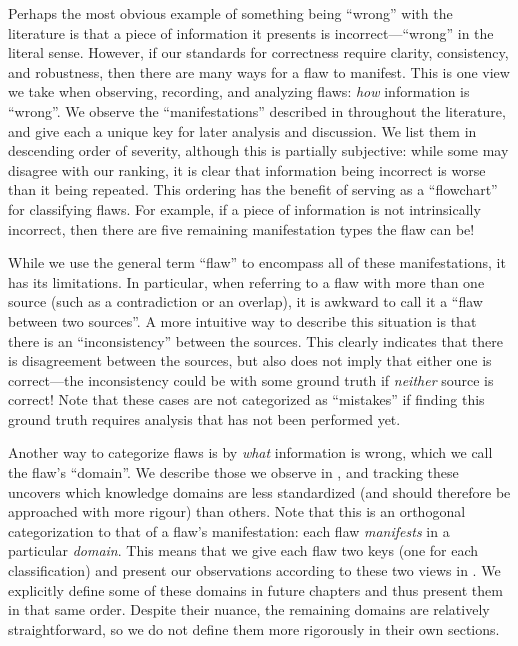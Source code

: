 Perhaps the most obvious example of something being ``wrong'' with the
literature is that a piece of information it presents is incorrect---``wrong''
in the literal sense. However, if our standards for correctness require
clarity, consistency, and robustness, then there are many ways for a flaw to
manifest. This is one view we take when observing, recording, and analyzing
flaws: \emph{how} information is ``wrong''. We observe the
``manifestations'' described in  throughout the
literature, and give each a unique key for later analysis and discussion. We
list them in descending order of severity, although this is partially
subjective: while some may disagree with our ranking, it is clear that
information being incorrect is worse than it being repeated. This ordering has
the benefit of serving as a ``flowchart'' for classifying flaws. For example,
if a piece of information is not intrinsically incorrect, then there are five
remaining manifestation types the flaw can be!




While we use the general term ``flaw'' to encompass all of these
manifestations, it has its limitations. In particular, when referring to a flaw
with more than one source (such as a contradiction or an overlap), it is
awkward to call it a ``flaw between two sources''. A more
intuitive way to describe this situation is that there is an ``inconsistency''
between the sources. This clearly indicates that there is disagreement between
the sources, but also does not imply that either one is correct---the
inconsistency could be with some ground truth
if \emph{neither} source is correct! Note that these
cases are not categorized as ``mistakes'' if finding this ground truth requires
analysis that has not been performed yet.

\ifnotpaper \newpage \fi



Another way to categorize flaws is by \emph{what} information is wrong, which
we call the flaw's ``domain''. We describe those we observe in
, and tracking these uncovers which knowledge domains
are less standardized (and should therefore be approached with more rigour)
than others. Note that this is an orthogonal categorization to that of a flaw's
manifestation: each flaw \emph{manifests} in a particular \emph{domain}. This
means that we give each flaw two keys (one for each classification) and
present our observations according to these two views in . We explicitly define some of these domains in future
chapters and thus present them in that same order. Despite their nuance, the
remaining domains are relatively straightforward, so we do not define them more
rigorously in their own sections.

